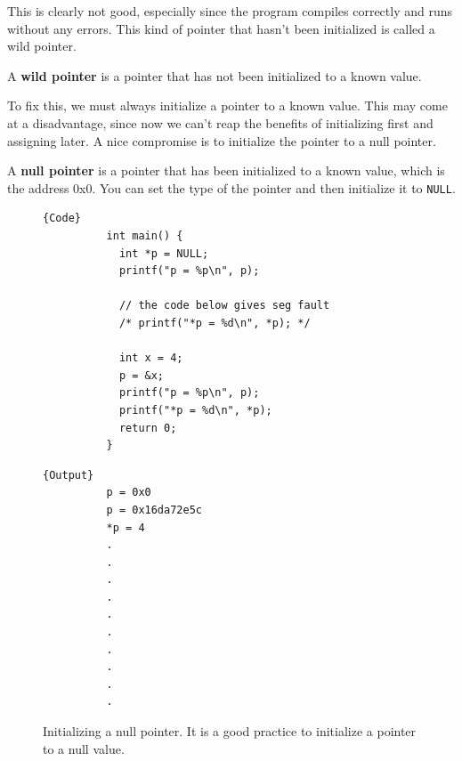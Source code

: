 \documentclass{article}
\newcounter{definition}[section]
\newcounter{code}[section]
\begin{document}
      This is clearly not good, especially since the program compiles correctly and runs without any errors. This kind of pointer that hasn't been initialized is called a wild pointer. 

      \begin{definition}
        \label{def:wild-pointer}
        A \textbf{wild pointer} is a pointer that has not been initialized to a known value. 
      \end{definition}

      To fix this, we must always initialize a pointer to a known value. This may come at a disadvantage, since now we can't reap the benefits of initializing first and assigning later. A nice compromise is to initialize the pointer to a null pointer. 

      \begin{definition}
        \label{def:null-pointer}
        A \textbf{null pointer} is a pointer that has been initialized to a known value, which is the address 0x0. You can set the type of the pointer and then initialize it to \texttt{NULL}. 
      \begin{figure}[H]
        \centering 
        \noindent\begin{minipage}{.5\textwidth}
        \begin{lstlisting}[]{Code}
          int main() { 
            int *p = NULL; 
            printf("p = %p\n", p); 
            
            // the code below gives seg fault
            /* printf("*p = %d\n", *p); */

            int x = 4; 
            p = &x; 
            printf("p = %p\n", p); 
            printf("*p = %d\n", *p);
            return 0; 
          }
        \end{lstlisting}
        \end{minipage}
        \hfill
        \begin{minipage}{.49\textwidth}
        \begin{lstlisting}[]{Output}
          p = 0x0
          p = 0x16da72e5c
          *p = 4
          .
          .
          .
          .
          .
          .
          .
          .
          .
          .
        \end{lstlisting}
        \end{minipage}
        \caption{Initializing a null pointer. It is a good practice to initialize a pointer to a null value. } 
        \label{fig:null_pointer}
      \end{figure}
      \end{definition}
\end{document}
